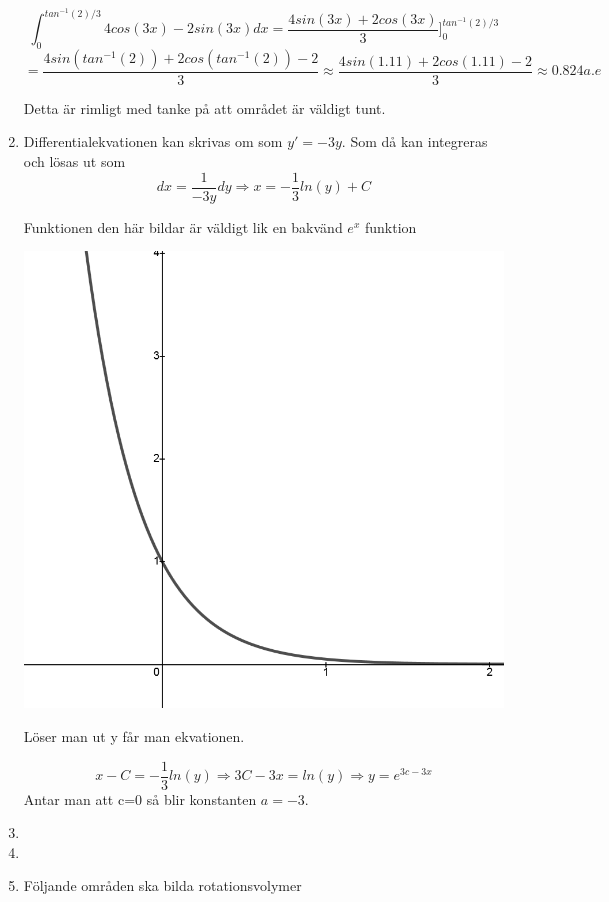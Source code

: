 \documentclass[a4paper,12pt]{article}
\begin{document}
\begin{enumerate}
    $$\int_0^{tan^{-1}(2)/3}4cos(3x)-2sin(3x)dx=\frac{4sin(3x)+2cos(3x)}{3}]^{tan^{-1}(2)/3}_0$$
    $$=\frac{4sin(tan^{-1}(2))+2cos(tan^{-1}(2))-2}{3}\approx \frac{4sin(1.11)+2cos(1.11)-2}{3}\approx 0.824 a.e$$

    Detta är rimligt med tanke på att området är väldigt tunt.

    \item Differentialekvationen kan skrivas om som $y'=-3y$. Som då kan integreras och lösas ut som
    $${dx}=\frac{1}{-3y}dy\Rightarrow x=-\frac{1}{3}ln(y)+C$$

    Funktionen den här bildar är väldigt lik en bakvänd $e^x$ funktion
    \begin{center}
        \includegraphics[scale=0.4]{Figur 5.png}
    \end{center}

    Löser man ut y får man ekvationen.

    $$x-C=-\frac{1}{3}ln(y)\Rightarrow 3C-3x=ln(y)\Rightarrow y=e^{3c-3x}$$
    Antar man att c=0 så blir konstanten $a=-3$.

    \item 

    \item 
    
    \item Följande områden ska bilda rotationsvolymer


\end{enumerate}
\end{document}
